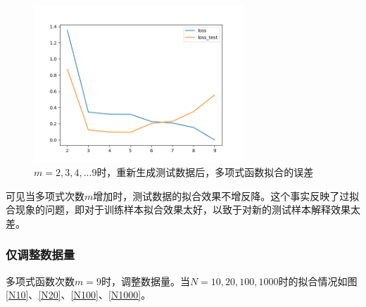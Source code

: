 \begin{figure}[htbp]
    \centering
    \includegraphics[width=0.7\textwidth]{figures/Figure_14.png}
    \caption{$m = 2, 3, 4, ... 9$时，重新生成测试数据后，多项式函数拟合的误差}
    \label{mn2}
\end{figure}

可见当多项式次数$m$增加时，测试数据的拟合效果不增反降。这个事实反映了过拟合现象的问题，即对于训练样本拟合效果太好，以致于对新的测试样本解释效果太差。

\subsubsection{仅调整数据量}

多项式函数次数$m = 9$时，调整数据量。当$N = 10, 20, 100, 1000$时的拟合情况如图\ref{N10}、\ref{N20}、\ref{N100}、\ref{N1000}。

